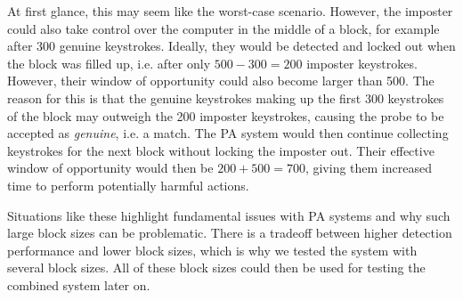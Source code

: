 At first glance, this may seem like the worst-case scenario.
However, the imposter could also take control over the computer in the middle of a block, for example after 300 genuine keystrokes.
Ideally, they would be detected and locked out when the block was filled up, i.e. after only $500-300 = 200$ imposter keystrokes.
However, their window of opportunity could also become larger than 500.
The reason for this is that the genuine keystrokes making up the first 300 keystrokes of the block may outweigh the 200 imposter keystrokes, causing the probe to be accepted as \textit{genuine}, i.e. a match.
The PA system would then continue collecting keystrokes for the next block without locking the imposter out.
Their effective window of opportunity would then be $200+500 = 700$, giving them increased time to perform potentially harmful actions.

Situations like these highlight fundamental issues with PA systems and why such large block sizes can be problematic.
There is a tradeoff between higher detection performance and lower block sizes, which is why we tested the system with several block sizes.
All of these block sizes could then be used for testing the combined system later on.

